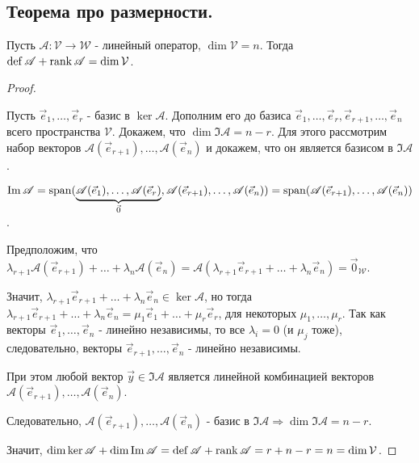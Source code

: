 \newpage


\subsection{
    Теорема про размерности.
}

\begin{theorem}
    Пусть $\mathscr{A} \colon \mathcal{V} \to \mathcal{W}$ - линейный оператор, $\dim \mathcal{V} = n$. Тогда $\operatorname{\mathop{\mathrm{def}}} \mathscr{A} + \operatorname{\mathop{\mathrm{rank}}} \mathscr{A} = \dim \mathcal{V}$.
\end{theorem}

\begin{proof}~

    Пусть $\vec{e}_1, \ldots, \vec{e}_r$ - базис в $\ker \mathscr{A}$. Дополним его до базиса $\vec{e}_1, \ldots, \vec{e}_r, \vec{e}_{r + 1}, \ldots, \vec{e}_n$ всего пространства $\mathcal{V}$. Докажем, что $\dim \Im \mathscr{A} = n - r$. Для этого рассмотрим набор векторов $\mathscr{A}(\vec{e}_{r + 1}), \ldots, \mathscr{A}(\vec{e}_n)$ и докажем, что он является базисом в $\Im \mathscr{A}$.

    \bigbreak

    $\operatorname{\mathop{\mathrm{Im}}} \mathscr{A} = \operatorname{\mathop{\mathrm{span}}}(\underbrace{\mathscr{A}(\vec{e}_1), \ldots, \mathscr{A}(\vec{e}_r)}_{\vec{0}}, \mathscr{A}(\vec{e}_{r + 1}), \ldots, \mathscr{A}(\vec{e}_n)) = \operatorname{\mathop{\mathrm{span}}}(\mathscr{A}(\vec{e}_{r + 1}), \ldots, \mathscr{A}(\vec{e}_n))$.

    Предположим, что $\lambda_{r + 1}\mathscr{A}(\vec{e}_{r + 1}) + \ldots + \lambda_n\mathscr{A}(\vec{e}_n) = \mathscr{A}(\lambda_{r + 1}\vec{e}_{r + 1} + \ldots + \lambda_n\vec{e}_n) = \vec{0}_{\mathcal{W}}.$

    Значит, $\lambda_{r + 1}\vec{e}_{r + 1} + \ldots + \lambda_n\vec{e}_n \in \ker \mathscr{A}$, но тогда $\lambda_{r + 1}\vec{e}_{r + 1} + \ldots + \lambda_n\vec{e}_n = \mu_1\vec{e}_1 + \ldots + \mu_r\vec{e}_r$, для некоторых $\mu_1, \ldots, \mu_r$. Так как векторы $\vec{e}_1, \ldots, \vec{e}_n$ - линейно независимы, то все $\lambda_i = 0$ (и $\mu_j$ тоже), следовательно, векторы $\vec{e}_{r + 1}, \ldots, \vec{e}_n$ - линейно независимы.

    \bigbreak

    При этом любой вектор $\vec{y} \in \Im \mathscr{A}$ является линейной комбинацией векторов $\mathscr{A}(\vec{e}_{r + 1}), \ldots, \mathscr{A}(\vec{e}_n)$.

    \bigbreak

    Следовательно, $\mathscr{A}(\vec{e}_{r + 1}), \ldots, \mathscr{A}(\vec{e}_n)$ - базис в $\Im \mathscr{A} \Rightarrow \dim \Im \mathscr{A} = n - r$.

    \bigbreak

    Значит, $\dim \ker \mathscr{A} + \dim \operatorname{\mathop{\mathrm{Im}}} \mathscr{A} = \operatorname{\mathop{\mathrm{def}}} \mathscr{A} + \operatorname{\mathop{\mathrm{rank}}} \mathscr{A} = r + n - r = n = \dim \mathcal{V}$.
\end{proof}

